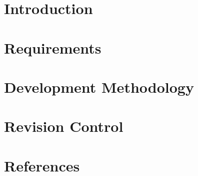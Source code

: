 \documentclass[pdftex,11pt,a4paper]{article}
\begin{document}
\section{Introduction}
	
	\pagebreak

\section{Requirements}
	
	\pagebreak

\section{Development Methodology}
	
	\pagebreak

\section{Revision Control}
	
	\pagebreak

\section{References}
	\def\refname{}
	
	
\end{document}
